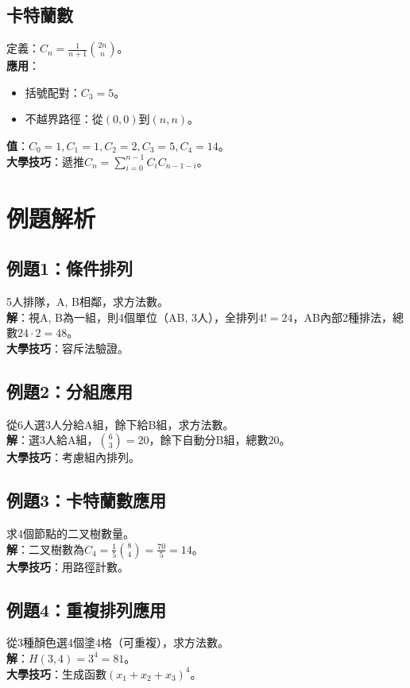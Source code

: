 \subsection{卡特蘭數}
定義：$C_n = \frac{1}{n+1} \binom{2n}{n}$。\\
\textbf{應用}：
\begin{itemize}
    \item 括號配對：$C_3 = 5$。
    \item 不越界路徑：從$(0,0)$到$(n,n)$。
\end{itemize}
\textbf{值}：$C_0 = 1, C_1 = 1, C_2 = 2, C_3 = 5, C_4 = 14$。\\
\textbf{大學技巧}：遞推$C_n = \sum_{i=0}^{n-1} C_i C_{n-1-i}$。

\section{例題解析}

\subsection{例題1：條件排列}
5人排隊，A, B相鄰，求方法數。\\
\textbf{解}：視A, B為一組，則4個單位（AB, 3人），全排列$4! = 24$，AB內部2種排法，總數$24 \cdot 2 = 48$。\\
\textbf{大學技巧}：容斥法驗證。

\subsection{例題2：分組應用}
從6人選3人分給A組，餘下給B組，求方法數。\\
\textbf{解}：選3人給A組，$\binom{6}{3} = 20$，餘下自動分B組，總數$20$。\\
\textbf{大學技巧}：考慮組內排列。

\subsection{例題3：卡特蘭數應用}
求4個節點的二叉樹數量。\\
\textbf{解}：二叉樹數為$C_4 = \frac{1}{5} \binom{8}{4} = \frac{70}{5} = 14$。\\
\textbf{大學技巧}：用路徑計數。

\subsection{例題4：重複排列應用}
從3種顏色選4個塗4格（可重複），求方法數。\\
\textbf{解}：$H(3, 4) = 3^4 = 81$。\\
\textbf{大學技巧}：生成函數$(x_1 + x_2 + x_3)^4$。

